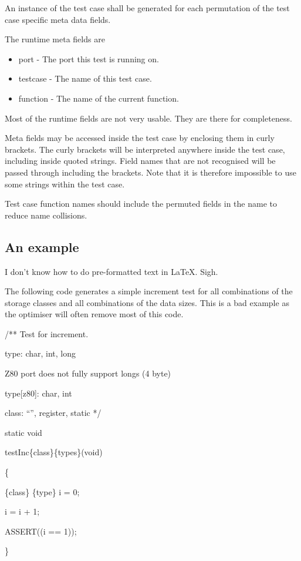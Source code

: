 \documentclass{widearticle}
\begin{document}
An instance of the test case shall be generated for each permutation
of the test case specific meta data fields.

The runtime meta fields are
\begin{itemize}
    \item port - The port this test is running on.
    \item testcase - The name of this test case.
    \item function - The name of the current function.
\end{itemize}

Most of the runtime fields are not very usable.  They are there for
completeness.

Meta fields may be accessed inside the test case by enclosing them in
curly brackets.  The curly brackets will be interpreted anywhere
inside the test case, including inside quoted strings.  Field names that
are not recognised will be passed through including the brackets.
Note that it is therefore impossible to use some strings within the
test case.

Test case function names should include the permuted fields in the
name to reduce name collisions.

\subsection{An example}
I don't know how to do pre-formatted text in \LaTeX.  Sigh.

The following code generates a simple increment test for all combinations of the
storage classes and all combinations of the data sizes.  This is a
bad example as the optimiser will often remove most of this code.

\tt{
/** Test for increment. 
 
    type: char, int, long

    Z80 port does not fully support longs (4 byte)

    type[z80]: char, int   


    class: ``'', register, static
*/

static void

testInc\{class\}\{types\}(void)

\{

    \{class\} \{type\} i = 0;
    
    i = i + 1;

    ASSERT((i == 1));

\}

}
\end{document}
